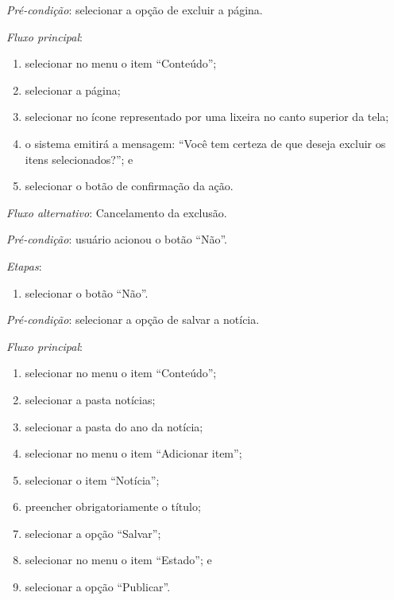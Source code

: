 \vspace{0.7cm}

\noindent \textit{Pré-condição}: selecionar a opção de excluir a página.

\noindent \textit{Fluxo principal}:

\begin{enumerate}
    \item selecionar no menu o item ``Conteúdo'';
    \item selecionar a página;
    \item selecionar no ícone representado por uma lixeira no canto superior da tela;
    \item o sistema emitirá a mensagem: ``Você tem certeza de que deseja excluir os itens selecionados?''; e
    \item selecionar o botão de confirmação da ação.
\end{enumerate}

\noindent \textit{Fluxo alternativo}: Cancelamento da exclusão.

\noindent \textit{Pré-condição}: usuário acionou o botão ``Não''.

\noindent \textit{Etapas}:

\begin{enumerate}
    \item selecionar o botão ``Não''.
\end{enumerate}


\vspace{0.7cm}

\noindent \textit{Pré-condição}: selecionar a opção de salvar a notícia.

\noindent \textit{Fluxo principal}:

\begin{enumerate}
    \item selecionar no menu o item ``Conteúdo'';
    \item selecionar a pasta notícias;
    \item selecionar a pasta do ano da notícia;
    \item selecionar no menu o item ``Adicionar item'';
    \item selecionar o item ``Notícia'';
    \item preencher obrigatoriamente o título;
    \item selecionar a opção ``Salvar'';
    \item selecionar no menu o item ``Estado''; e
    \item selecionar a opção ``Publicar''.
\end{enumerate}

